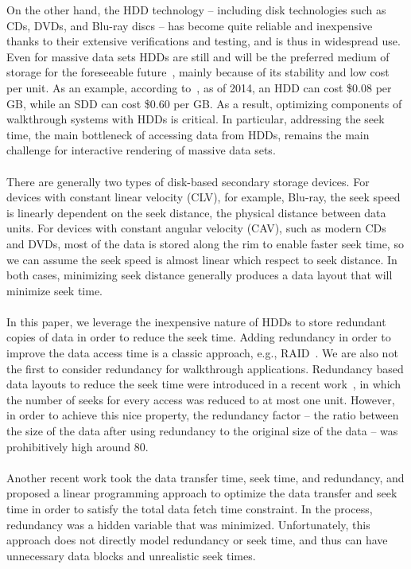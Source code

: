 On the other hand, the HDD technology -- including disk technologies such as
CDs, DVDs, and Blu-ray discs -- has become quite reliable and inexpensive
thanks to their extensive verifications and testing, and is thus in widespread
use.  Even for massive data sets HDDs are still and will be
the preferred medium of storage for the foreseeable future~\cite{Rizvi10},
mainly
because of its stability and low cost per unit. As an example, according
to~\cite{pcmagarticle}, as of 2014, an HDD can cost \$0.08 per GB, while an SDD
can cost \$0.60 per GB. As a result, optimizing components of walkthrough
systems with HDDs is critical. In particular, addressing the seek time, the
main bottleneck of accessing data from HDDs, remains the main challenge for
interactive rendering of massive data sets. \\
\\
There are generally two types of disk-based secondary storage devices. For devices with constant linear velocity (CLV), for example, Blu-ray, the seek speed is linearly dependent on the seek distance, the physical distance between data units. For devices with constant angular velocity (CAV), such as modern CDs and DVDs, most of the data is stored along the rim to enable faster seek time, so we can assume the seek speed is almost linear which respect to seek distance. In both cases, minimizing seek distance generally produces a data layout that will minimize seek time. \\
\\
In this paper, we leverage the inexpensive nature of HDDs to store redundant
copies of data in order to reduce the seek time. Adding redundancy in order to
improve the data access time is a classic approach, e.g.,
RAID~\cite{Patterson88}.  We are also not the first to consider redundancy for
walkthrough applications.  Redundancy based data layouts to reduce the seek
time were introduced in a recent work~\cite{singleseeklayout}, in which the
number of seeks for every access was reduced to at most one unit. However, in
order to achieve this nice property, the redundancy factor -- the ratio between
the size of the data after using redundancy to the original size of the data --
was
prohibitively high around 80. \\
\\
Another recent work \cite{optimizingredundancy} took the data transfer time, seek time,
and redundancy, and proposed a linear programming approach to optimize the data
transfer and seek time in order to satisfy the total data fetch time
constraint. In the process, redundancy was a hidden variable that was
minimized. Unfortunately, this approach does not directly model redundancy or
seek time, and thus can have unnecessary data blocks and unrealistic seek
times.

